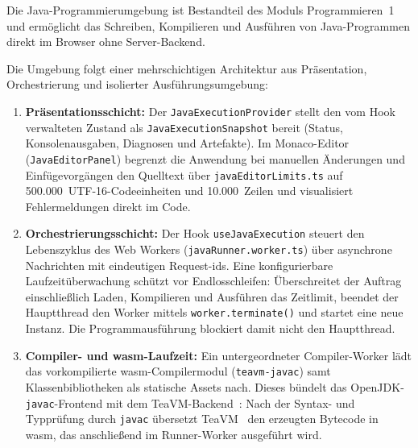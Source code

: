 
Die Java-Programmierumgebung ist Bestandteil des Moduls \glqq Programmieren~1\grqq{} und ermöglicht das Schreiben, Kompilieren und Ausführen von Java-Programmen direkt im Browser ohne Server-Backend.


Die Umgebung folgt einer mehrschichtigen Architektur aus Präsentation, Orchestrierung und isolierter Ausführungsumgebung:
\begin{enumerate}
  \item \textbf{Präsentationsschicht:} Der \verb|JavaExecutionProvider| stellt den vom Hook verwalteten Zustand als \verb|JavaExecutionSnapshot| bereit (Status, Konsolenausgaben, Diagnosen und Artefakte). Im Monaco-Editor~\cite{monacoeditor} (\verb|JavaEditorPanel|) begrenzt die Anwendung bei manuellen Änderungen und Einfügevorgängen den Quelltext über \verb|javaEditorLimits.ts| auf 500.000~UTF-16-Codeeinheiten und 10.000~Zeilen und visualisiert Fehlermeldungen direkt im Code.
  \item \textbf{Orchestrierungsschicht:} Der Hook \verb|useJavaExecution| steuert den Lebenszyklus des Web Workers (\verb|javaRunner.worker.ts|) über asynchrone Nachrichten mit eindeutigen Request-\glspl{id}. Eine konfigurierbare Laufzeitüberwachung schützt vor Endlosschleifen: Überschreitet der Auftrag einschließlich Laden, Kompilieren und Ausführen das Zeitlimit, beendet der Hauptthread den Worker mittels \texttt{worker.\allowbreak{}terminate()} und startet eine neue Instanz. Die Programmausführung blockiert damit nicht den Hauptthread.
  \item \textbf{Compiler- und \gls{wasm}-Laufzeit:} Ein untergeordneter Compiler-Worker lädt das vorkompilierte \gls{wasm}-Compilermodul (\texttt{teavm-javac}) samt Klassenbibliotheken als statische Assets nach. Dieses bündelt das OpenJDK-\verb|javac|-Frontend mit dem TeaVM-Backend~\cite{teavm}: Nach der Syntax- und Typprüfung durch \verb|javac| übersetzt TeaVM~\cite{teavm} den erzeugten Bytecode in \gls{wasm}, das anschließend im Runner-Worker ausgeführt wird.
\end{enumerate}



